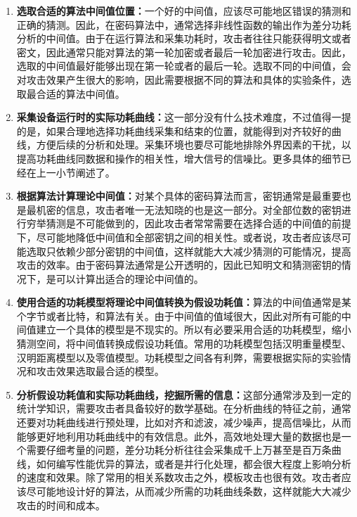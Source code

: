 \begin{enumerate}
\item \textbf{选取合适的算法中间值位置：}一个好的中间值，应该尽可能地区错误的猜测和正确的猜测。因此，在密码算法中，通常选择非线性函数的输出作为差分功耗分析的中间值。由于在运行算法和采集功耗时，攻击者往往只能获得明文或者密文，因此通常只能对算法的第一轮加密或者最后一轮加密进行攻击。因此，选取的中间值最好能够出现在第一轮或者的最后一轮。选取不同的中间值，会对攻击效果产生很大的影响，因此需要根据不同的算法和具体的实验条件，选取最合适的算法中间值。
\item \textbf{采集设备运行时的实际功耗曲线：}这一部分没有什么技术难度，不过值得一提的是，如果合理地选择功耗曲线采集和结束的位置，就能得到对齐较好的曲线，方便后续的分析和处理。采集环境也要尽可能地排除外界因素的干扰，以提高功耗曲线同数据和操作的相关性，增大信号的信噪比。更多具体的细节已经在上一小节阐述了。
\item \textbf{根据算法计算理论中间值：}对某个具体的密码算法而言，密钥通常是最重要也是最机密的信息，攻击者唯一无法知晓的也是这一部分。对全部位数的密钥进行穷举猜测是不可能做到的，因此攻击者常常需要在选择合适的中间值的前提下，尽可能地降低中间值和全部密钥之间的相关性。或者说，攻击者应该尽可能选取只依赖少部分密钥的中间值，这样就能大大减少猜测的可能情况，提高攻击的效率。由于密码算法通常是公开透明的，因此已知明文和猜测密钥的情况下，是可以计算出适合的理论中间值的。
\item \textbf{使用合适的功耗模型将理论中间值转换为假设功耗值：}算法的中间值通常是某个字节或者比特，和算法有关。由于中间值的值域很大，因此对所有可能的中间值建立一个具体的模型是不现实的。所以有必要采用合适的功耗模型，缩小猜测空间，将中间值转换成假设功耗值。常用的功耗模型包括汉明重量模型、汉明距离模型以及零值模型。功耗模型之间各有利弊，需要根据实际的实验情况和攻击效果选取最合适的模型。
\item \textbf{分析假设功耗值和实际功耗曲线，挖掘所需的信息：}这部分通常涉及到一定的统计学知识，需要攻击者具备较好的数学基础。在分析曲线的特征之前，通常还要对功耗曲线进行预处理，比如对齐和滤波，减少噪声，提高信噪比，从而能够更好地利用功耗曲线中的有效信息。此外，高效地处理大量的数据也是一个需要仔细考量的问题，差分功耗分析往往会采集成千上万甚至是百万条曲线，如何编写性能优异的算法，或者是并行化处理，都会很大程度上影响分析的速度和效果。除了常用的相关系数攻击之外，模板攻击也很有效。攻击者应该尽可能地设计好的算法，从而减少所需的功耗曲线条数，这样就能大大减少攻击的时间和成本。
\end{enumerate}

\vspace*{0.5\baselineskip}

